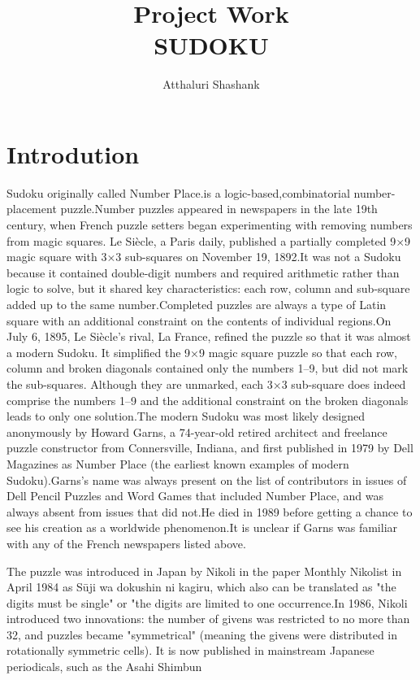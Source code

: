 \documentclass[12pt]{article}
\title{Project Work\\SUDOKU}
\author{Atthaluri Shashank}
\begin{document}
\maketitle
\section{Introdution}
      Sudoku originally called Number Place.is a logic-based,combinatorial number-placement puzzle.Number puzzles appeared in newspapers in the late 19th century, when French puzzle setters began experimenting with removing numbers from magic squares. Le Siècle, a Paris daily, published a partially completed 9×9 magic square with 3×3 sub-squares on November 19, 1892.It was not a Sudoku because it contained double-digit numbers and required arithmetic rather than logic to solve, but it shared key characteristics: each row, column and sub-square added up to the same number.Completed puzzles are always a type of Latin square with an additional constraint on the contents of individual regions.On July 6, 1895, Le Siècle's rival, La France, refined the puzzle so that it was almost a modern Sudoku. It simplified the 9×9 magic square puzzle so that each row, column and broken diagonals contained only the numbers 1–9, but did not mark the sub-squares. Although they are unmarked, each 3×3 sub-square does indeed comprise the numbers 1–9 and the additional constraint on the broken diagonals leads to only one solution.The modern Sudoku was most likely designed anonymously by Howard Garns, a 74-year-old retired architect and freelance puzzle constructor from Connersville, Indiana, and first published in 1979 by Dell Magazines as Number Place (the earliest known examples of modern Sudoku).Garns's name was always present on the list of contributors in issues of Dell Pencil Puzzles and Word Games that included Number Place, and was always absent from issues that did not.He died in 1989 before getting a chance to see his creation as a worldwide phenomenon.It is unclear if Garns was familiar with any of the French newspapers listed above. 
      
      The puzzle was introduced in Japan by Nikoli in the paper Monthly Nikolist in April 1984 as Sūji wa dokushin ni kagiru, which also can be translated as "the digits must be single" or "the digits are limited to one occurrence.In 1986, Nikoli introduced two innovations: the number of givens was restricted to no more than 32, and puzzles became "symmetrical" (meaning the givens were distributed in rotationally symmetric cells). It is now published in mainstream Japanese periodicals, such as the Asahi Shimbun
      
\end{document}
